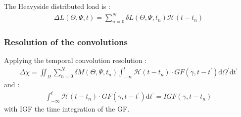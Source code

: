 \documentclass[letterpaper,10pt,english]{sphinxmanual}
\begin{document}
\sphinxAtStartPar
The Heavyside distributed load is :
\begin{equation*}
\begin{split}\Delta L(\Theta,\Psi,t)=\sum_{n=0}^{N} \delta L(\Theta,\Psi,t_n)\mathcal{H} (t-t_n)\end{split}
\end{equation*}

\subsubsection{Resolution of the convolutions}
\label{\detokenize{Theory:resolution-of-the-convolutions}}
\sphinxAtStartPar
Applying the temporal convolution resolution :
\begin{equation*}
\begin{split}\Delta \chi= \iint_{\Omega} \sum_{n=0}^{N} \delta M(\Theta,\Psi,t_n) \int_{-\infty}^t  \mathcal{H} (t-t_n) \cdot G F\left(\gamma, t-t^{\prime}\right) \mathrm{d} \Omega^{\prime} \mathrm{d} t^{\prime}\end{split}
\end{equation*}
\sphinxAtStartPar
and :
\begin{equation*}
\begin{split}\int_{-\infty}^t  \mathcal{H} (t-t_n) \cdot G F\left(\gamma, t-t^{\prime}\right) \mathrm{d} t^{\prime} = I G F\left(\gamma, t-t_n \right)\end{split}
\end{equation*}
\sphinxAtStartPar
with IGF the time integration of the GF.
\end{document}
